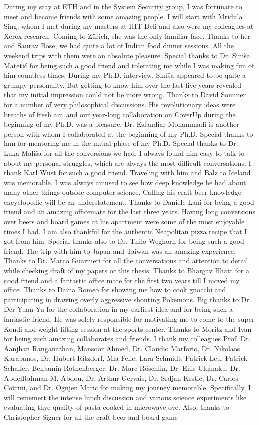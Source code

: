 During my stay at ETH and in the System Security group, I was fortunate to meet and become friends with some amazing people. I will start with Mridula Sing, whom I met during my masters at IIIT-Deli and also were my colleagues at Xerox research. Coming to Z\"urich, she was the only familiar face. Thanks to her and Saurav Bose, we had quite a lot of Indian food dinner sessions. All the weekend trips with them were an absolute pleasure. Special thanks to Dr. Sini\v{s}a Mateti\'c for being such a good friend and tolerating me while I was making fun of him countless times. During my Ph.D. interview, Sini\v{s}a appeared to be quite a grumpy personality. But getting to know him over the last five years revealed that my initial impression could not be more wrong. Thanks to David Sommer for a number of very philosophical discussions. His revolutionary ideas were breaths of fresh air, and our year-long collaboration on CoverUp during the beginning of my Ph.D. was a pleasure. Dr. Esfandiar Mohammadi is another person with whom I collaborated at the beginning of my Ph.D. Special thanks to him for mentoring me in the initial phase of my Ph.D. Special thanks to Dr. Luka Mali\v{s}a for all the conversions we had. I always found him easy to talk to about my personal struggles, which are always the most difficult conversations. I thank Karl W\"ust for such a good friend. Traveling with him and Balz to Iceland was memorable. I was always amused to see how deep knowledge he had about many other things outside computer science. Calling his craft beer knowledge encyclopedic will be an understatement. Thanks to Daniele Lani for being a good friend and an amazing officemate for the last three years. Having long conversions over beers and board games at his apartment were some of the most enjoyable times I had. I am also thankful for the authentic Neapolitan pizza recipe that I got from him. Special thanks also to Dr. Thilo Weghorn for being such a good friend. The trip with him to Japan and Taiwan was an amazing experience. Thanks to Dr. Marco Guarnieri for all the conversations and attention to detail while checking draft of my papers or this thesis. Thanks to Bhargav Bhatt for a good friend and a fantastic office mate for the first two years till I moved my office. Thanks to Daina Romeo for showing me how to cook gnocchi and participating in drawing overly aggressive shouting Pokemons. Big thanks to Dr. Der-Yuan Yu for the collaboration in my earliest idea and for being such a fantastic friend. He was solely responsible for motivating me to come to the super Kondi and weight lifting session at the sports center. Thanks to Moritz and Ivan for being such amazing collaborates and friends. I thank my colleagues  Prof. Dr. Aanjhan Ranganathan, Mansoor Ahmed, Dr. Claudio Marforio, Dr. Nikolaos Karapanos, Dr. Hubert Ritzdorf, Mia Felic, Lara Schmidt, Patrick Leu, Patrick Schaller, Benjamin Rothenberger, Dr. Marc R\"oschlin, Dr. Enis Ulqinaku, Dr. AbdelRahman M. Abdou, Dr. Arthur Gervais, Dr. Srdjan Krstic, Dr. Carlos Cotrini, and Dr. Ognjen Maric for making my journey memorable. Specifically, I will rememert the intense lunch discussion and various science experiments like evaluating thye quality of pasta cooked in microwave ove. Also, thanks to Christopher Signer for all the craft beer and board game 